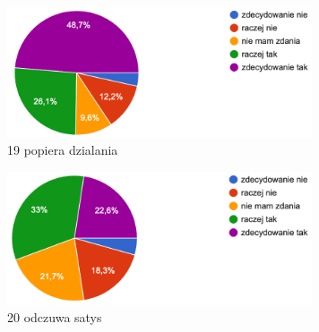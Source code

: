 \documentclass[a4paper,12pt,twoside,openany]{report}
\begin{document}
\begin{figure}
    \includegraphics[width=9cm]{wyniki/19_popiera_dzialania}
    \caption{ 19 popiera dzialania }
\end{figure}

\begin{figure}
    \includegraphics[width=9cm]{wyniki/20_odczuwa_satys}
    \caption{ 20 odczuwa satys }
\end{figure}



\zakonczenie  %
\end{document}
